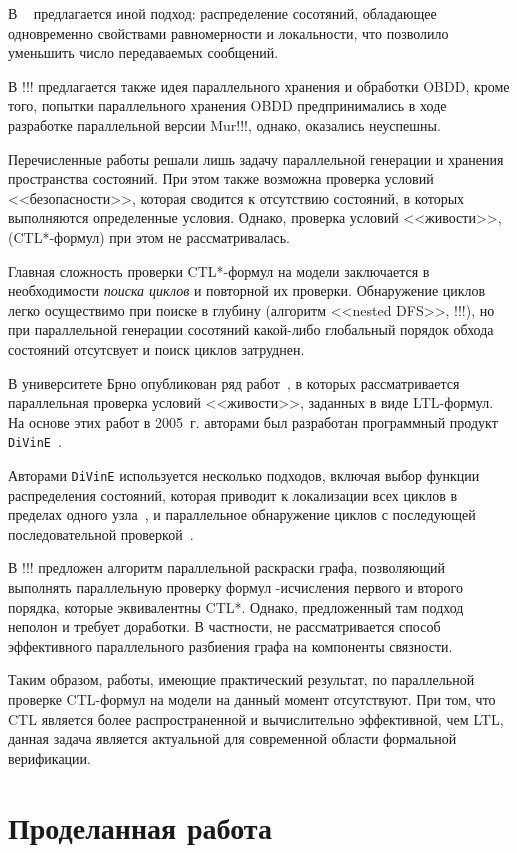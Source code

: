 \documentclass[a4paper,notitlepage,14pt]{article}
\begin{document}
В ~\cite{LS99} предлагается иной подход: распределение сосотяний, обладающее одновременно
свойствами равномерности и локальности, что позволило уменьшить число передаваемых
сообщений.

В !!! предлагается также идея параллельного хранения и обработки OBDD, кроме того, попытки
параллельного хранения OBDD предпринимались в ходе разработке параллельной версии
Mur\phi!!!, однако, оказались неуспешны.

Перечисленные работы решали лишь задачу параллельной генерации и хранения пространства
состояний. При этом также возможна проверка условий <<безопасности>>, которая сводится к
отсутствию состояний, в которых выполняются определенные условия. Однако, проверка условий
<<живости>>, (CTL*-формул) при этом не рассматривалась.

Главная сложность проверки CTL*-формул на модели заключается в необходимости \emph{поиска
  циклов} и повторной их проверки. Обнаружение циклов легко осуществимо при поиске в
глубину (алгоритм <<nested DFS>>, !!!), но при параллельной генерации сосотяний какой-либо
глобальный порядок обхода состояний отсутсвует и поиск циклов затруднен.

В университете Брно опубликован ряд работ~\cite{DLTL1,DLTL2}, в которых рассматривается
параллельная проверка условий <<живости>>, заданных в виде LTL-формул. На основе этих
работ в 2005~г. авторами был разработан программный продукт \texttt{DiVinE}~\cite{DiVinE}.

Авторами \texttt{DiVinE} используется несколько подходов, включая выбор функции
распределения состояний, которая приводит к локализации всех циклов в пределах одного
узла~\cite{DLTL1}, и параллельное обнаружение циклов с последующей последовательной
проверкой~\cite{DLTL2}.

В !!! предложен алгоритм параллельной раскраски графа, позволяющий выполнять параллельную
проверку формул \mu-исчисления первого и второго порядка, которые эквивалентны
CTL*. Однако, предложенный там подход неполон и требует доработки. В частности, не
рассматривается способ эффективного параллельного разбиения графа на компоненты связности.

Таким образом, работы, имеющие практический результат, по параллельной проверке CTL-формул
на модели на данный момент отсутствуют. При том, что CTL является более распространенной и
вычислительно эффективной, чем LTL, данная задача является актуальной для современной
области формальной верификации.

\section{Проделанная работа}
\label{sec:my-work}
\end{document}
